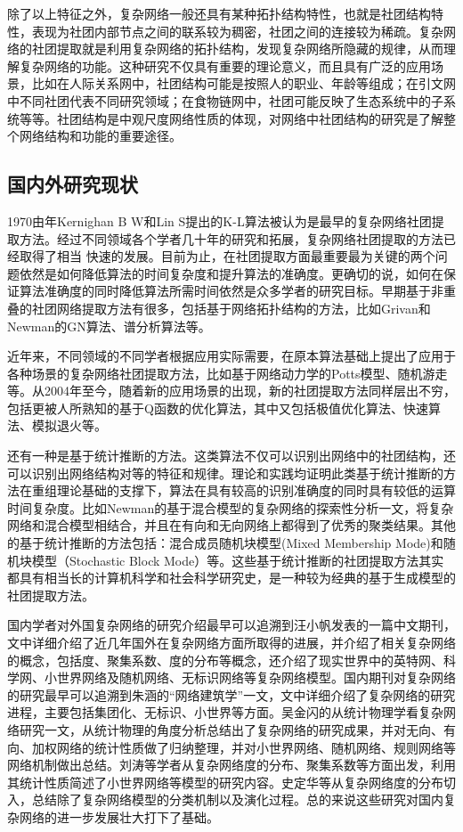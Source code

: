 \documentclass[a4paper,12pt,openany,oneside,utf-8]{ctexbook}
\begin{document}
	除了以上特征之外，复杂网络一般还具有某种拓扑结构特性，也就是社团结构特性，表现为社团内部节点之间的联系较为稠密，社团之间的连接较为稀疏。复杂网络的社团提取就是利用复杂网络的拓扑结构，发现复杂网络所隐藏的规律，从而理解复杂网络的功能。这种研究不仅具有重要的理论意义，而且具有广泛的应用场景，比如在人际关系网中，社团结构可能是按照人的职业、年龄等组成；在引文网中不同社团代表不同研究领域；在食物链网中，社团可能反映了生态系统中的子系统等等。社团结构是中观尺度网络性质的体现，对网络中社团结构的研究是了解整个网络结构和功能的重要途径。
	\subsection{国内外研究现状}
	1970由年Kernighan B W和Lin S提出的K-L算法\cite{ref4}被认为是最早的复杂网络社团提取方法。经过不同领域各个学者几十年的研究和拓展，复杂网络社团提取的方法已经取得了相当
    快速的发展。目前为止，在社团提取方面最重要最为关键的两个问题依然是如何降低算法的时间复杂度和提升算法的准确度。更确切的说，如何在保证算法准确度的同时降低算法所需时间依然是众多学者的研究目标。早期基于非重叠的社团网络提取方法有很多，包括基于网络拓扑结构的方法，比如Grivan\cite{ref5}和Newman\cite{ref6}的GN算法、谱分析算法等。
    
    近年来，不同领域的不同学者根据应用实际需要，在原本算法基础上提出了应用于各种场景的复杂网络社团提取方法，比如基于网络动力学的Potts模型、随机游走等\cite{ref7,ref8,ref9}。从2004年至今，随着新的应用场景的出现，新的社团提取方法同样层出不穷，包括更被人所熟知的基于Q函数的优化算法\cite{ref10,ref11,ref12}，其中又包括极值优化算法、快速算法、模拟退火等。
    
	还有一种是基于统计推断的方法。这类算法不仅可以识别出网络中的社团结构，还可以识别出网络结构对等的特征和规律。理论和实践均证明此类基于统计推断的方法在重组理论基础的支撑下，算法在具有较高的识别准确度的同时具有较低的运算时间复杂度。比如Newman\cite{ref13}的基于混合模型的复杂网络的探索性分析一文，将复杂网络和混合模型相结合，并且在有向和无向网络上都得到了优秀的聚类结果。其他的基于统计推断的方法包括：混合成员随机块模型(Mixed Membership Mode)和随机块模型（Stochastic Block Mode）等。这些基于统计推断的社团提取方法其实都具有相当长的计算机科学和社会科学研究史，是一种较为经典的基于生成模型的社团提取方法。
	
	国内学者对外国复杂网络的研究介绍最早可以追溯到汪小帆\cite{ref14}发表的一篇中文期刊，文中详细介绍了近几年国外在复杂网络方面所取得的进展，并介绍了相关复杂网络的概念，包括度、聚集系数、度的分布等概念，还介绍了现实世界中的英特网、科学网、小世界网络及随机网络、无标识网络等复杂网络模型。国内期刊对复杂网络的研究最早可以追溯到朱涵\cite{ref15}的“网络建筑学”一文，文中详细介绍了复杂网络的研究进程，主要包括集团化、无标识、小世界等方面。吴金闪\cite{ref16}的从统计物理学看复杂网络研究一文，从统计物理的角度分析总结出了复杂网络的研究成果，并对无向、有向、加权网络的统计性质做了归纳整理，并对小世界网络、随机网络、规则网络等网络机制做出总结。刘涛\cite{ref17}等学者从复杂网络度的分布、聚集系数等方面出发，利用其统计性质简述了小世界网络等模型的研究内容。史定华\cite{ref18}等从复杂网络度的分布切入，总结除了复杂网络模型的分类机制以及演化过程。总的来说这些研究对国内复杂网络的进一步发展壮大打下了基础。
	
\end{document}
